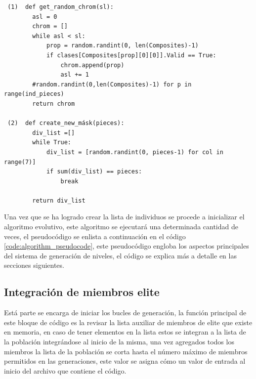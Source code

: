 \begin{listing}[ht]
  \begin{verbatim}
 (1)  def get_random_chrom(sl):
        asl = 0
        chrom = []
        while asl < sl:
            prop = random.randint(0, len(Composites)-1)
            if clases[Composites[prop][0][0]].Valid == True:
                chrom.append(prop)
                asl += 1
        #random.randint(0,len(Composites)-1) for p in range(ind_pieces)
        return chrom

 (2)  def create_new_másk(pieces):
        div_list =[]
        while True:
            div_list = [random.randint(0, pieces-1) for col in range(7)]
            if sum(div_list) == pieces:
                break
          
        return div_list
  \end{verbatim}
  \caption{Código de asignación de cromosomas(piezas)[1] y código para generar máscaras [2]}
  \label{code:get_random_chrom}
\end{listing}

Una vez que se ha logrado crear la lista de individuos se procede a inicializar
el algoritmo evolutivo, este algoritmo se ejecutará una determinada cantidad de
veces, el pseudocódigo se enlista a continuación en el código
\ref{code:algorithm_pseudocode}, este pseudocódigo engloba los aspectos
principales del sistema de generación de niveles, el código se explica más a
detalle en las secciones siguientes.

\begin{listing}[ht]
  \scalebox{.8}{}
  \caption{Pseudo-código del algoritmo genético}
  \label{code:algorithm_pseudocode}
\end{listing}

\subsection{Integración de miembros elite}
\label{subsection:elite_member_integration}

Está parte se encarga de iniciar los bucles de generación, la función principal
de este bloque de código es la revisar la lista auxiliar de miembros de elite
que existe en memoria, en caso de tener elementos en la lista estos se integran
a la lista de la población integrándose al inicio de la misma, una vez agregados
todos los miembros la lista de la población se corta hasta el número máximo de
miembros permitidos en las generaciones, este valor se asigna cómo un valor de
entrada al inicio del archivo que contiene el código.

